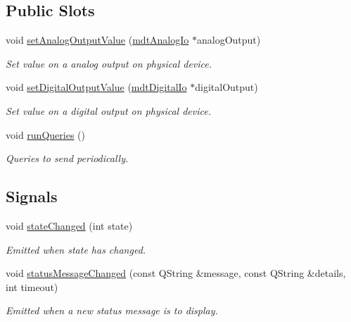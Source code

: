 \subsection*{Public Slots}
\begin{DoxyCompactItemize}
\item 
void \hyperlink{classmdt_device_a83cdf442f4cec7261742ca5939e390a1}{setAnalogOutputValue} (\hyperlink{classmdt_analog_io}{mdtAnalogIo} $\ast$analogOutput)
\begin{DoxyCompactList}\small\item\em Set value on a analog output on physical device. \end{DoxyCompactList}\item 
void \hyperlink{classmdt_device_a93abbc706a1e6601ce947eee5e50fba6}{setDigitalOutputValue} (\hyperlink{classmdt_digital_io}{mdtDigitalIo} $\ast$digitalOutput)
\begin{DoxyCompactList}\small\item\em Set value on a digital output on physical device. \end{DoxyCompactList}\item 
void \hyperlink{classmdt_device_a14634fec6cd6bae810562b3bd88a5c05}{runQueries} ()
\begin{DoxyCompactList}\small\item\em Queries to send periodically. \end{DoxyCompactList}\end{DoxyCompactItemize}
\subsection*{Signals}
\begin{DoxyCompactItemize}
\item 
void \hyperlink{classmdt_device_aecd2d9d2cc3665f2084d0fd20eb3db2d}{stateChanged} (int state)
\begin{DoxyCompactList}\small\item\em Emitted when state has changed. \end{DoxyCompactList}\item 
void \hyperlink{classmdt_device_a3fbc6e71241e2e9daa2d8557f870c03c}{statusMessageChanged} (const QString \&message, const QString \&details, int timeout)
\begin{DoxyCompactList}\small\item\em Emitted when a new status message is to display. \end{DoxyCompactList}\end{DoxyCompactItemize}
